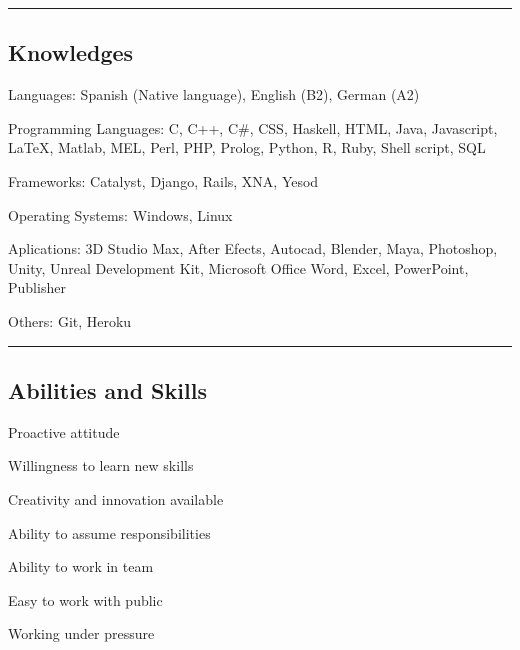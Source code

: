 \documentclass[10pt,letterpaper]{article}
\newenvironment{indentsection}[1]%
{\begin{list}{}%
	{\setlength{\leftmargin}{#1}}%
	\item[]%
}
{\end{list}}
\begin{document}

\hrule
\vspace{-0.4em}
\subsection*{Knowledges}

\begin{indentsection}{\parindent}
\begin{description*}
	
\item[Languages:]
  Spanish (Native language), English (B2), German (A2)
\item[Programming Languages:]
  C, C++, C\#, CSS, Haskell, HTML, Java, Javascript, \LaTeX, Matlab, MEL, Perl, PHP, Prolog, Python, R, Ruby, Shell script, SQL
\item[Frameworks:]
  Catalyst, Django, Rails, XNA, Yesod
\item[Operating Systems:]
  Windows, Linux
\item[Aplications:]
  3D Studio Max, After Efects, Autocad, Blender, Maya, Photoshop, Unity, Unreal Development Kit, Microsoft Office Word, Excel, PowerPoint, Publisher
\item[Others:]
  Git, Heroku
  
\end{description*}
\end{indentsection}


\hrule
\vspace{-0.4em}
\subsection*{Abilities and Skills}

\begin{indentsection}{\parindent}
\begin{description*}

\item
  Proactive attitude
\item
  Willingness to learn new skills
\item
  Creativity and innovation available
\item
  Ability to assume responsibilities
\item
  Ability to work in team
\item
  Easy to work with public
\item
  Working under pressure

\end{description*}
\end{indentsection}
\end{document}
